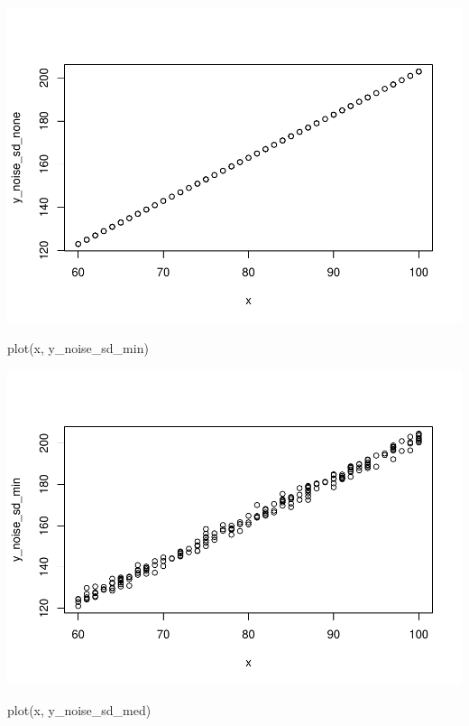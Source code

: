 \documentclass[
]{book}
\newenvironment{Shaded}{\begin{snugshade}}{\end{snugshade}}
\newcommand{\FunctionTok}[1]{\textcolor[rgb]{0.00,0.00,0.00}{#1}}
\newcommand{\NormalTok}[1]{#1}
\begin{document}
\includegraphics{test_course_notes_files/figure-latex/remedy030-1.pdf}

\begin{Shaded}
\begin{Highlighting}[]
\FunctionTok{plot}\NormalTok{(x, y\_noise\_sd\_min)}
\end{Highlighting}
\end{Shaded}

\includegraphics{test_course_notes_files/figure-latex/remedy030-2.pdf}

\begin{Shaded}
\begin{Highlighting}[]
\FunctionTok{plot}\NormalTok{(x, y\_noise\_sd\_med)}
\end{Highlighting}
\end{Shaded}
\end{document}
